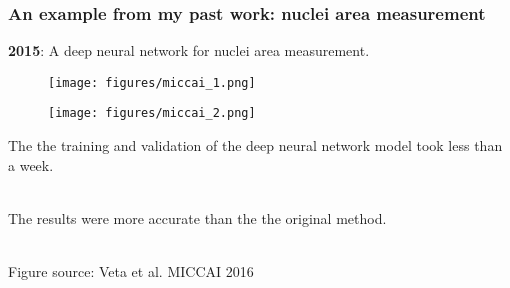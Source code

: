 \documentclass[notes]{beamer}          %
\newif\iffull
\begin{document}
\begin{frame}
\frametitle{An example from my past work: nuclei area measurement}

\textbf{2015}: A deep neural network for nuclei area measurement.

\begin{figure}[ht]
        \begin{minipage}[b]{0.3\linewidth}
            \centering
            \texttt{[image: figures/miccai\_1.png]}
        \end{minipage}
        \hspace{0.5cm}
        \begin{minipage}[b]{0.5\linewidth}
            \centering
            \texttt{[image: figures/miccai\_2.png]}
        \end{minipage}
 \end{figure}


The the training and validation of the deep neural network model took less than a week. \\~\

The results were more accurate than the the original method.  \\~\

{\tiny Figure source: Veta et al. MICCAI 2016}

\end{frame}

\iffull
\begin{frame}
\frametitle{An example from my past work: nuclei area measurement}

In the first case, I translated the domain knowledge of (medical) experts about nuclei appearance into a series of \textbf{manually written rules} that perform nuclei segmentation. \\~\

In the second case, I took a dataset of nuclei segmentations and fed it to a (deep) machine learning algorithm that \textbf{learned} how to directly measure nuclei size \textbf{from the provided examples}.

\end{frame}
\fi
\end{document}

